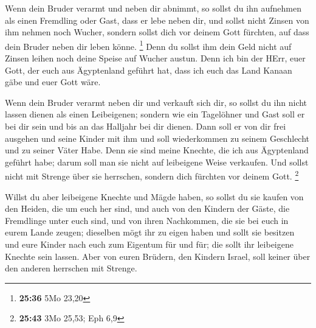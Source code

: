 Wenn dein Bruder verarmt und neben dir abnimmt, so
sollst du ihn aufnehmen als einen Fremdling oder Gast, dass er lebe
neben dir,  und sollst nicht Zinsen von ihm nehmen noch
Wucher, sondern sollst dich vor deinem Gott fürchten, auf dass dein
Bruder neben dir leben könne. \footnote{\textbf{25:36} 5Mo 23,20}
 Denn du sollst ihm dein Geld nicht auf Zinsen leihen
noch deine Speise auf Wucher austun.  Denn ich bin der
HErr, euer Gott, der euch aus Ägyptenland geführt hat, dass ich euch das
Land Kanaan gäbe und euer Gott wäre.

 Wenn dein Bruder verarmt neben dir und verkauft sich
dir, so sollst du ihn nicht lassen dienen als einen Leibeigenen;
 sondern wie ein Tagelöhner und Gast soll er bei dir sein
und bis an das Halljahr bei dir dienen.  Dann soll er von
dir frei ausgehen und seine Kinder mit ihm und soll wiederkommen zu
seinem Geschlecht und zu seiner Väter Habe.  Denn sie
sind meine Knechte, die ich aus Ägyptenland geführt habe; darum soll man
sie nicht auf leibeigene Weise verkaufen.  Und sollst
nicht mit Strenge über sie herrschen, sondern dich fürchten vor deinem
Gott. \footnote{\textbf{25:43} 3Mo 25,53; Eph 6,9}

 Willst du aber leibeigene Knechte und Mägde haben, so
sollst du sie kaufen von den Heiden, die um euch her sind,
 und auch von den Kindern der Gäste, die Fremdlinge unter
euch sind, und von ihren Nachkommen, die sie bei euch in eurem Lande
zeugen; dieselben mögt ihr zu eigen haben  und sollt sie
besitzen und eure Kinder nach euch zum Eigentum für und für; die sollt
ihr leibeigene Knechte sein lassen. Aber von euren Brüdern, den Kindern
Israel, soll keiner über den anderen herrschen mit Strenge.

